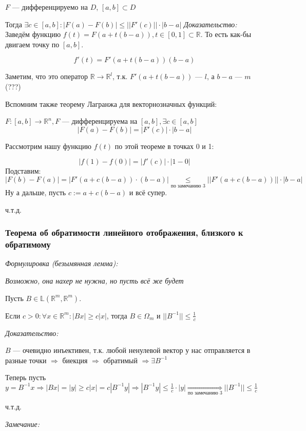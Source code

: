 \documentclass{article}
\begin{document}
$F$ --- дифференцируемо на $D$, $[a, b] \subset D$

Тогда $\exists c \in [a, b]: |F(a) - F(b)| \le ||F'(c)|| \cdot |b - a|$
\textit{Доказательство:}
Заведём функцию $f(t) = F(a + t(b - a)), t \in [0, 1] \subset \mathbb{R}$. То есть как-бы двигаем точку по $[a, b]$.

\[f'(t) = F'(a + t(b - a))(b - a)\]

Заметим, что это оператор $\mathbb{R} \rightarrow \mathbb{R}^l$, т.к. $F'(a + t(b - a))$ --- $l$, а $b - a$ --- $m$ (???)

Вспомним также теорему Лагранжа для векторнозначных функций:

$F: [a, b] \rightarrow \mathbb{R}^n, F$ --- дифференцируема на $[a, b], \exists c \in [a, b]$
\[|F(a) - F(b)| = |F'(c)| \cdot |b - a|\]

Рассмотрим нашу функцию $f(t)$ по этой теореме в точках 0 и 1:

\[|f(1) - f(0)| = |f'(c)| \cdot |1 - 0|\]
Подставим:
\[|F(b) - F(a)| = |F'(a + c(b - a))\cdot(b - a)| \underset{\text{по замечанию 3}}{\le} ||F'(a + c(b - a))|| \cdot |b - a|\]
Ну а дальше, пусть $c := a + c(b - a)$ и всё супер.

ч.т.д.



\subsubsection{Теорема об обратимости линейного отображения, близкого к обратимому}
\textit{Формулировка (безымянная лемма):}

\textit{Возможно, она нахер не нужна, но пусть всё же будет}

Пусть $B \in \mathbb{L}(\mathbb{R}^m, \mathbb{R}^m)$.

Если $c > 0: \forall x \in \mathbb{R}^m: |Bx| \ge c|x|$, тогда $B \in \Omega_m$ и $||B^{-1}|| \le \frac{1}{c}$

\textit{Доказательство:}

$B$ --- очевидно инъективен, т.к. любой ненулевой вектор у нас отправляется в разные точки $\Rightarrow$ биекция $\Rightarrow$ обратимый $\Rightarrow \exists B^{-1}$

Теперь пусть $y = B^{-1}x \Rightarrow |Bx| = |y| \ge c|x| = c |B^{-1}y| \Rightarrow |B^{-1}y| \le \frac{1}{c} \cdot |y| \underset{\text{по замечанию 3}}{\Rightarrow} ||B^{-1}|| \le \frac{1}{c}$

ч.т.д.

\textit{Замечание:}
\end{document}
